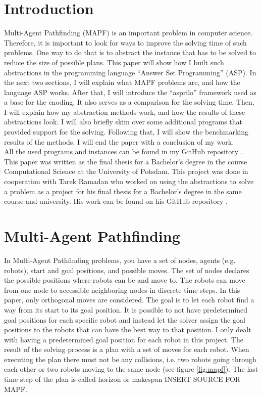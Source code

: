 \documentclass[runningheads]{llncs}
\begin{document}
\section{Introduction}
Multi-Agent Pathfinding (MAPF) is an important problem in computer science. Therefore, it is important to look for ways to improve the solving time of such problems. One way to do that is to abstract the instance that has to be solved to reduce the size of
possible plans. This paper will show how I built such abstractions in the programming language ``Answer Set Programming'' (ASP). In the next two sections, I will explain what MAPF problems are, and how the language ASP works. After that, I will introduce the ``asprilo'' framework used as a base for the enoding. It also serves as a comparison for the solving time. Then, I will explain how my abstraction methods work, and how the results of these abstractions look. I will also briefly skim over some additional programs that provided support for the solving. Following that, I will show the benchmarking results of the methods. I will end the paper with a conclusion of my work. \\
All the used programs and instances can be found in my GitHub repository \cite{my-git}. This paper was written as the final thesis for a Bachelor's degree in the course Computational Science at the University of Potsdam. This project was done in cooperation with Tarek Ramadan who worked on using the abstractions to solve a problem as a project for his final thesis for a Bachelor's degree in the same course and university. His work can be found on his GitHub repository \cite{tarek-git}.

\section{Multi-Agent Pathfinding}
In Multi-Agent Pathfinding problems, you have a set of nodes, agents (e.g. robots), start and goal positions, and possible moves. The set of nodes declares the possible positions where robots can be and move to. The robots can move from one node to accessible neighboring nodes in discrete time steps. In this paper, only orthogonal moves are considered. The goal is to let each robot find a way from its start to its goal position. It is possible to not have predetermined goal positions for each specific robot and instead let the solver assign the goal positions to the robots that can have the best way to that position. I only dealt with having a predetermined goal position for each robot in this project. The result of the solving process is a plan with a set of moves for each robot. When executing the plan there must not be any collisions, i.e. two robots going through each other or two robots moving to the same node (see figure \ref{fig:mapf}). The last time step of the plan is called horizon or makespan INSERT SOURCE FOR MAPF. 
\end{document}
